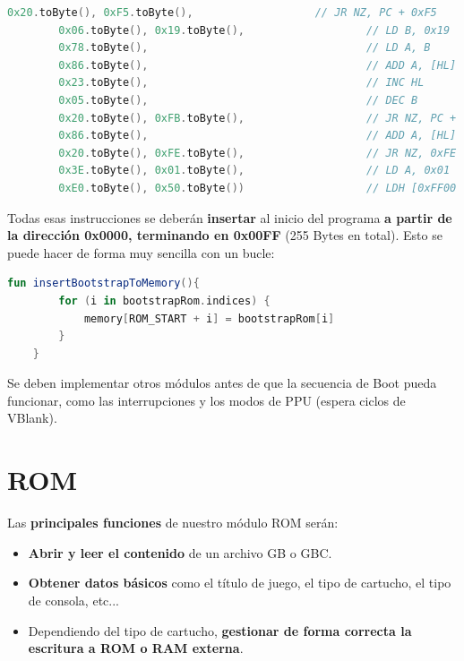 \begin{lstlisting}[language=Kotlin, caption={Secuencia de arranque y logo de Nintendo}, label={code:kotlinboot}]
        0x20.toByte(), 0xF5.toByte(),                   // JR NZ, PC + 0xF5
        0x06.toByte(), 0x19.toByte(),                   // LD B, 0x19
        0x78.toByte(),                                  // LD A, B
        0x86.toByte(),                                  // ADD A, [HL]
        0x23.toByte(),                                  // INC HL
        0x05.toByte(),                                  // DEC B
        0x20.toByte(), 0xFB.toByte(),                   // JR NZ, PC + 0xFB
        0x86.toByte(),                                  // ADD A, [HL]
        0x20.toByte(), 0xFE.toByte(),                   // JR NZ, 0xFE
        0x3E.toByte(), 0x01.toByte(),                   // LD A, 0x01
        0xE0.toByte(), 0x50.toByte())                   // LDH [0xFF00 + 0x50], A
\end{lstlisting}

Todas esas instrucciones se deberán \textbf{insertar} al inicio del programa \textbf{a partir de la dirección 0x0000, terminando en 0x00FF} (255 Bytes en total). Esto se puede hacer de forma muy sencilla con un bucle:

\begin{lstlisting}[language=Kotlin, caption={Copiado del Boot en memoria}, label={code:kotlinbootcopy}]
    fun insertBootstrapToMemory(){
        for (i in bootstrapRom.indices) {
            memory[ROM_START + i] = bootstrapRom[i]
        }
    }
\end{lstlisting}

Se deben implementar otros módulos antes de que la secuencia de Boot pueda funcionar, como las interrupciones y los modos de PPU (espera ciclos de VBlank).

\section{ROM}

Las \textbf{principales funciones} de nuestro módulo ROM serán:

\begin{itemize}
    \item \textbf{Abrir y leer el contenido} de un archivo GB o GBC.
    \item \textbf{Obtener datos básicos} como el título de juego, el tipo de cartucho, el tipo de consola, etc...
    \item Dependiendo del tipo de cartucho, \textbf{gestionar de forma correcta la escritura a ROM o RAM externa}.
\end{itemize}

